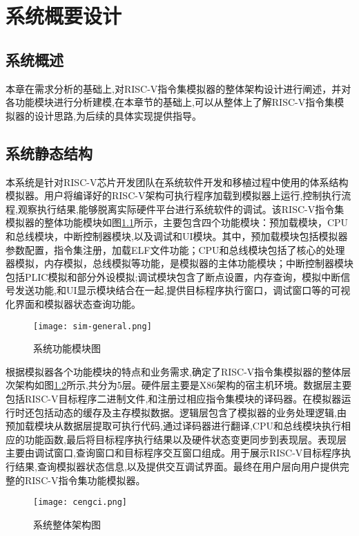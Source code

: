 
\chapter{系统概要设计}

\section{系统概述}
本章在需求分析的基础上,对RISC-V指令集模拟器的整体架构设计进行阐述，并对各功能模块进行分析建模,在本章节的基础上,可以从整体上了解RISC-V指令集模拟器的设计思路,为后续的具体实现提供指导。


\section{系统静态结构}
本系统是针对RISC-V芯片开发团队在系统软件开发和移植过程中使用的体系结构模拟器。用户将编译好的RISC-V架构可执行程序加载到模拟器上运行,控制执行流程,观察执行结果,能够脱离实际硬件平台进行系统软件的调试。该RISC-V指令集模拟器的整体功能模块如图\ref{fig:sim_general}所示，主要包含四个功能模块：预加载模块，CPU和总线模块，中断控制器模块,以及调试和UI模块。其中，预加载模块包括模拟器参数配置，指令集注册，加载ELF文件功能；CPU和总线模块包括了核心的处理器模拟，内存模拟，总线模拟等功能，是模拟器的主体功能模块；中断控制器模块包括PLIC模拟和部分外设模拟;调试模块包含了断点设置，内存查询，模拟中断信号发送功能,和UI显示模块结合在一起,提供目标程序执行窗口，调试窗口等的可视化界面和模拟器状态查询功能。
\begin{figure}[H]
  \centering
  \texttt{[image: sim-general.png]}
  \caption{系统功能模块图}
  \label{fig:sim_general}
\end{figure}


根据模拟器各个功能模块的特点和业务需求,确定了RISC-V指令集模拟器的整体层次架构如图\ref{fig:structure}所示,共分为5层。硬件层主要是X86架构的宿主机环境。数据层主要包括RISC-V目标程序二进制文件,和注册过相应指令集模块的译码器。在模拟器运行时还包括动态的缓存及主存模拟数据。逻辑层包含了模拟器的业务处理逻辑,由预加载模块从数据层提取可执行代码,通过译码器进行翻译,CPU和总线模块执行相应的功能函数,最后将目标程序执行结果以及硬件状态变更同步到表现层。表现层主要由调试窗口,查询窗口和目标程序交互窗口组成。用于展示RISC-V目标程序执行结果,查询模拟器状态信息,以及提供交互调试界面。最终在用户层向用户提供完整的RISC-V指令集功能模拟器。


\begin{figure}[H]
  \centering
  \texttt{[image: cengci.png]}
  \caption{系统整体架构图}
  \label{fig:structure}
\end{figure}


